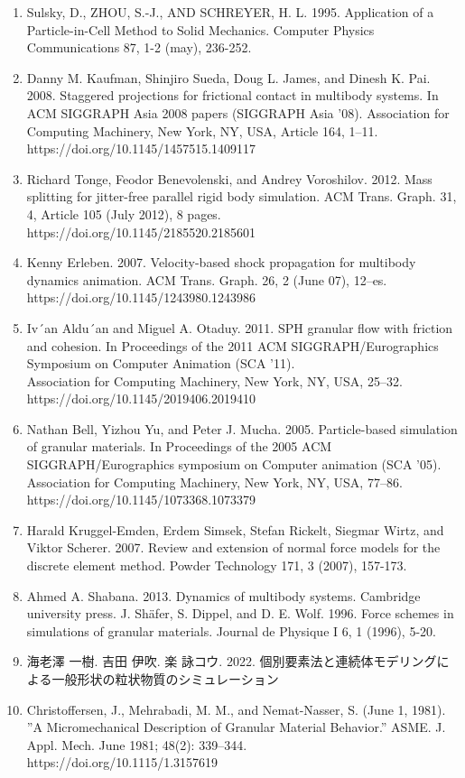 \documentclass[12pt]{ltjsarticle}
\begin{document}
\begin{enumerate}
\item Sulsky, D., ZHOU, S.-J., AND SCHREYER, H. L. 1995. Application of a Particle-in-Cell Method to Solid Mechanics. Computer Physics Communications 87, 1-2 (may), 236-252.
\item Danny M. Kaufman, Shinjiro Sueda, Doug L. James, and Dinesh K. Pai. 2008. Staggered projections for frictional contact in multibody systems. In ACM SIGGRAPH Asia 2008 papers (SIGGRAPH Asia ’08). Association for Computing Machinery, New York, NY, USA, Article 164, 1–11. \\ https://doi.org/10.1145/1457515.1409117
\item Richard Tonge, Feodor Benevolenski, and Andrey Voroshilov. 2012. Mass splitting for jitter-free parallel rigid body simulation. ACM Trans. Graph. 31, 4, Article 105 (July 2012), 8 pages.\\ https://doi.org/10.1145/2185520.2185601
\item Kenny Erleben. 2007. Velocity-based shock propagation for multibody dynamics animation. ACM Trans. Graph. 26, 2 (June 07), 12–es.\\ https://doi.org/10.1145/1243980.1243986
\item Iv´an Aldu´an and Miguel A. Otaduy. 2011. SPH granular flow with friction and cohesion. In Proceedings of the 2011 ACM SIGGRAPH/Eurographics Symposium on Computer Animation (SCA ’11).\\
Association for Computing Machinery, New York, NY, USA, 25–32. https://doi.org/10.1145/2019406.2019410
\item Nathan Bell, Yizhou Yu, and Peter J. Mucha. 2005. Particle-based simulation of granular materials. In Proceedings of the 2005 ACM SIGGRAPH/Eurographics symposium on Computer animation (SCA ’05). Association for Computing Machinery, New York, NY, USA, 77–86.\\ https://doi.org/10.1145/1073368.1073379
\item Harald Kruggel-Emden, Erdem Simsek, Stefan Rickelt, Siegmar Wirtz, and Viktor Scherer. 2007. Review and extension of normal force models for the discrete element method. Powder Technology 171, 3 (2007), 157-173.
\item Ahmed A. Shabana. 2013. Dynamics of multibody systems. Cambridge university press. J. Shäfer, S. Dippel, and D. E. Wolf. 1996. Force schemes in simulations of granular materials. Journal de Physique I 6, 1 (1996), 5-20.
\item  海老澤 一樹. 吉田 伊吹. 楽 詠コウ. 2022. 個別要素法と連続体モデリングによる一般形状の粒状物質のシミュレーション
\item Christoffersen, J., Mehrabadi, M. M., and Nemat-Nasser, S. (June 1, 1981). ”A Micromechanical Description of Granular Material Behavior.” ASME. J. Appl. Mech. June 1981; 48(2): 339–344.\\ https://doi.org/10.1115/1.3157619

\end{enumerate}
\end{document}
